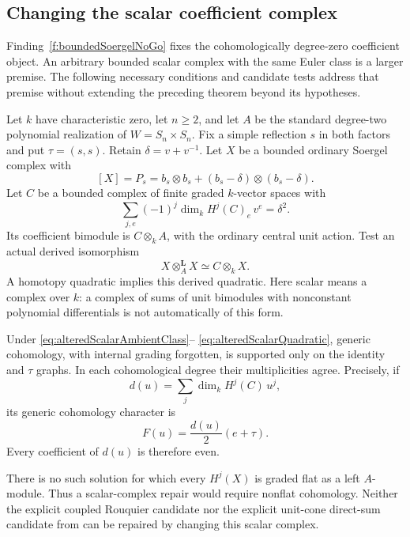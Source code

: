 \subsection{Changing the scalar coefficient complex}

Finding~\ref{f:boundedSoergelNoGo} fixes the cohomologically
degree-zero coefficient object. An arbitrary bounded scalar
complex with the same Euler class is a larger premise. The
following necessary conditions and candidate tests address
that premise without extending the preceding theorem beyond
its hypotheses.

Let \(k\) have characteristic zero, let \(n\geq2\), and let
\(A\) be the standard degree-two polynomial realization of
\(W=S_n\times S_n\). Fix a simple reflection \(s\) in both
factors and put \(\tau=(s,s)\). Retain
\(\delta=v+v^{-1}\).
Let \(X\) be a bounded ordinary Soergel complex with
\begin{equation}\label{eq:alteredScalarAmbientClass}
 [X]=P_s=b_s\otimes b_s+
                    (b_s-\delta)\otimes(b_s-\delta).
\end{equation}
Let \(C\) be a bounded complex of finite graded
\(k\)-vector spaces with
\begin{equation}\label{eq:alteredScalarEuler}
 \sum_{j,e}(-1)^j\dim_k H^j(C)_e\,v^e=\delta^2.
\end{equation}
Its coefficient bimodule is \(C\otimes_k A\), with the
ordinary central unit action. Test an actual derived
isomorphism
\begin{equation}\label{eq:alteredScalarQuadratic}
 X\otimes_A^{\mathbf L}X\simeq C\otimes_k X.
\end{equation}
A homotopy quadratic implies this derived quadratic.
Here scalar means a complex over \(k\): a complex of sums
of unit bimodules with nonconstant polynomial differentials
is not automatically of this form.

\begin{finding}
\label{f:alteredScalarSoergel}
Under \eqref{eq:alteredScalarAmbientClass}--
\eqref{eq:alteredScalarQuadratic}, generic cohomology,
with internal grading forgotten, is supported only on the
identity and \(\tau\) graphs. In each cohomological degree
their multiplicities agree. Precisely, if
\[
 d(u)=\sum_j\dim_k H^j(C)\,u^j,
\]
its generic cohomology character is
\begin{equation}\label{eq:alteredScalarUniformGraphs}
                    F(u)=\frac{d(u)}2(e+\tau).
\end{equation}
Every coefficient of \(d(u)\) is therefore even.

There is no such solution for which every \(H^j(X)\) is
graded flat as a left \(A\)-module. Thus a scalar-complex
repair would require nonflat cohomology. Neither the
explicit coupled Rouquier candidate nor the explicit
unit-cone direct-sum candidate from  can be
repaired by changing this scalar complex.
\end{finding}

